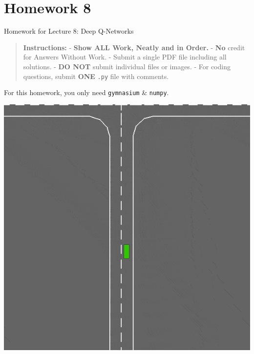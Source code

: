 \documentclass[
  letterpaper,
  DIV=11,
  numbers=noendperiod]{scrreprt}
\makeatletter
\newcommand*\pandocbounded[1]{%
  \sbox\pandoc@box{#1}%
  \Gscale@div\@tempa{\textheight}{\dimexpr\ht\pandoc@box+\dp\pandoc@box\relax}%
  \Gscale@div\@tempb{\linewidth}{\wd\pandoc@box}%
  \ifdim\@tempb\p@<\@tempa\p@\let\@tempa\@tempb\fi%
  \ifdim\@tempa\p@<\p@\scalebox{\@tempa}{\usebox\pandoc@box}%
  \else\usebox{\pandoc@box}%
  \fi%
}
\makeatother
\begin{document}
\section{\texorpdfstring{\href{https://colab.research.google.com/drive/1Y_A4uKoSmjc6EmU-Or7tbeo3fe_ZD4RH?usp=sharing}{\protect\pandocbounded{}}}{}}\label{section-5}

\chapter{Homework 8}\label{homework-8}

\begin{tcolorbox}[enhanced jigsaw, colback=white, left=2mm, breakable, opacityback=0, bottomrule=.15mm, rightrule=.15mm, arc=.35mm, colframe=quarto-callout-note-color-frame, leftrule=.75mm, toprule=.15mm]

Homework for Lecture 8: Deep Q-Networks 📝

\end{tcolorbox}

\begin{quote}
\textbf{Instructions:} - \textbf{Show ALL Work, Neatly and in Order.} -
\textbf{No} credit for Answers Without Work. - Submit a single PDF file
including all solutions. - \textbf{DO NOT} submit individual files or
images. - For coding questions, submit \textbf{ONE} \texttt{.py} file
with comments.
\end{quote}

\begin{tcolorbox}[enhanced jigsaw, opacityback=0, left=2mm, breakable, bottomtitle=1mm, rightrule=.15mm, colframe=quarto-callout-note-color-frame, titlerule=0mm, colback=white, opacitybacktitle=0.6, toptitle=1mm, title=\textcolor{quarto-callout-note-color}{\faInfo}\hspace{0.5em}{Note}, colbacktitle=quarto-callout-note-color!10!white, bottomrule=.15mm, arc=.35mm, coltitle=black, leftrule=.75mm, toprule=.15mm]

For this homework, you only need \texttt{gymnasium} \& \texttt{numpy}.

\end{tcolorbox}

\begin{center}
\includegraphics[width=0.4\linewidth,height=\textheight,keepaspectratio]{homework/images/highway.gif}
\end{center}
\end{document}
